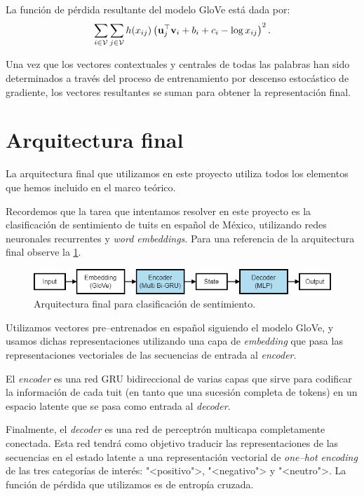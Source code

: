 \documentclass[12pt]{article}
\newcommand{\ce}{\bm{\textbf v}}
\newcommand{\co}{\bm{\textbf u}}
\begin{document}
La función de pérdida resultante del modelo GloVe está dada por:
\begin{equation}
    \sum_{i \in \mathcal{V}}\sum_{j \in \mathcal{V}}h(x_{ij}) \left( \co_j^{\top}\ce_i + b_i + c_i - \log x_{ij} \right)^2.
\end{equation}

Una vez que los vectores contextuales y centrales de todas las palabras han sido determinados a través del proceso de entrenamiento por descenso estocástico de gradiente, los vectores resultantes se suman para obtener la representación final.

\section{Arquitectura final}

La arquitectura final que utilizamos en este proyecto utiliza todos los elementos que hemos incluido en el marco teórico. 

Recordemos que la tarea que intentamos resolver en este proyecto es la clasificación de sentimiento de tuits en español de México, utilizando redes neuronales recurrentes y \textit{word embeddings}. Para una referencia de la arquitectura final observe la \cref{fig:final}.

\begin{figure}
    \centering
    \includegraphics[width=0.9\linewidth]{images/final}
    \caption{Arquitectura final para clasificación de sentimiento.}
    \label{fig:final}
\end{figure}

Utilizamos vectores pre--entrenados en español siguiendo el modelo GloVe, y usamos dichas representaciones utilizando una capa de \textit{embedding} que pasa las representaciones vectoriales de las secuencias de entrada al \textit{encoder}. 

El \textit{encoder} es una red GRU bidireccional de varias capas que sirve para codificar la información de cada tuit (en tanto que una sucesión completa de tokens) en un espacio latente que se pasa como entrada al \textit{decoder}.

Finalmente, el \textit{decoder} es una red de perceptrón multicapa completamente conectada. Esta red tendrá como objetivo traducir las representaciones de las secuencias en el estado latente a una representación vectorial de \textit{one--hot encoding} de las tres categorías de interés: "<positivo">, "<negativo"> y "<neutro">. La función de pérdida que utilizamos es de entropía cruzada.


\printbibliography[title={Referencias y bibliografía}]
\end{document}
